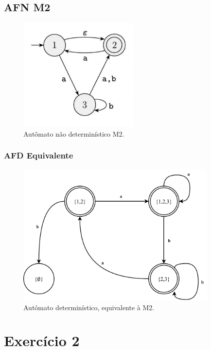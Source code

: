 \documentclass[a4paper, 12pt]{article}
\begin{document}
\newpage

\subsection{AFN M2}

\begin{figure}[!ht]
    \centering
    \includegraphics[width=6cm]{./imgs/task-1-afn2.png}
    \caption{Autômato não determinístico M2.}
    \label{fig:afn2}
\end{figure}

\subsubsection{AFD Equivalente}

\begin{figure}[!ht]
    \centering
    \includegraphics[width=10cm]{./imgs/afd-2.pdf}
    \caption{Autômato determinístico, equivalente à M2.}
    \label{fig:afd2}
\end{figure}

\newpage
\section{Exercício 2}
\end{document}
